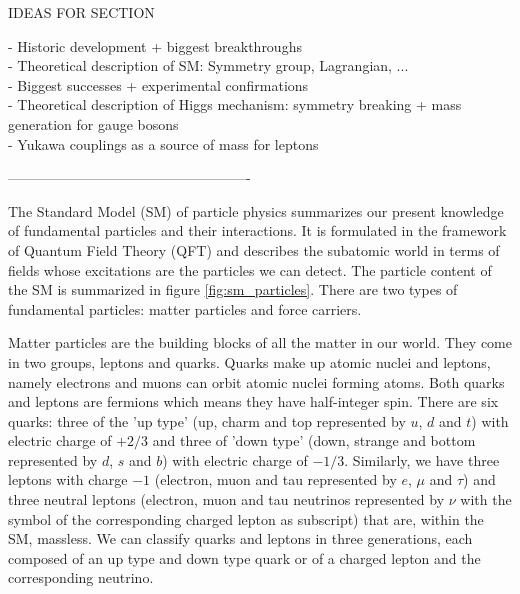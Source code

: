 IDEAS FOR SECTION

- Historic development +  biggest breakthroughs  \\
- Theoretical description of SM: Symmetry group, Lagrangian, ...\\
- Biggest successes + experimental confirmations\\

- Theoretical description of Higgs mechanism: symmetry breaking + mass generation for gauge bosons\\
- Yukawa couplings as a source of mass for leptons

----------------------------------------------------

The Standard Model (SM) of particle physics summarizes our present knowledge of fundamental particles and their interactions. It is formulated in the framework of Quantum Field Theory (QFT) and describes the subatomic world in terms of fields whose excitations are the particles we can detect. The particle content of the SM is summarized in figure \ref{fig:sm_particles}. There are two types of fundamental particles: matter particles and force carriers. 

Matter particles are the building blocks of all the matter in our world. They come in two groups, leptons and quarks. Quarks make up atomic nuclei and leptons, namely electrons and muons can orbit atomic nuclei forming atoms. Both quarks and leptons are fermions which means they have half-integer spin. There are six quarks: three of the 'up type' (up, charm and top represented by $u$, $d$ and $t$) with electric charge of $+2/3$ and three of 'down type' (down, strange and bottom represented by $d$, $s$ and $b$) with electric charge of $-1/3$. Similarly, we have three leptons with charge $-1$ (electron, muon and tau represented by $e$, $\mu$ and $\tau$) and three neutral leptons (electron, muon and tau neutrinos represented by $\nu$ with the symbol of the corresponding charged lepton as subscript) that are, within the SM, massless. We can classify quarks and leptons in three generations, each composed of an up type and down type quark or of a charged lepton and the corresponding neutrino.

